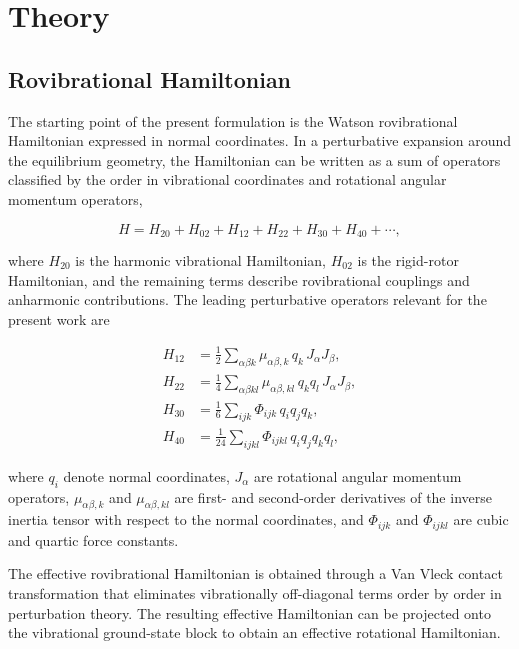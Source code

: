 \documentclass[aip,jcp,reprint]{revtex4-2}
\begin{document}
\section{Theory}

\subsection{Rovibrational Hamiltonian}

The starting point of the present formulation is the Watson rovibrational
Hamiltonian expressed in normal coordinates. In a perturbative expansion
around the equilibrium geometry, the Hamiltonian can be written as a sum
of operators classified by the order in vibrational coordinates and
rotational angular momentum operators,
\cite{Watson1968,Watson1977,AlievWatson1976}

\begin{equation}
H = H_{20} + H_{02} + H_{12} + H_{22} + H_{30} + H_{40} + \cdots ,
\end{equation}

where $H_{20}$ is the harmonic vibrational Hamiltonian,
$H_{02}$ is the rigid-rotor Hamiltonian, and the remaining terms
describe rovibrational couplings and anharmonic contributions.
The leading perturbative operators relevant for the present work are

\begin{align}
H_{12} &=
\frac{1}{2}
\sum_{\alpha\beta k}
\mu_{\alpha\beta,k}\,
q_k\,J_\alpha J_\beta ,
\\
H_{22} &=
\frac{1}{4}
\sum_{\alpha\beta kl}
\mu_{\alpha\beta,kl}\,
q_k q_l\,J_\alpha J_\beta ,
\\
H_{30} &=
\frac{1}{6}
\sum_{ijk}
\Phi_{ijk}\,
q_i q_j q_k ,
\\
H_{40} &=
\frac{1}{24}
\sum_{ijkl}
\Phi_{ijkl}\,
q_i q_j q_k q_l ,
\end{align}

where $q_i$ denote normal coordinates,
$J_\alpha$ are rotational angular momentum operators,
$\mu_{\alpha\beta,k}$ and $\mu_{\alpha\beta,kl}$ are first- and
second-order derivatives of the inverse inertia tensor with respect to
the normal coordinates, and $\Phi_{ijk}$ and $\Phi_{ijkl}$ are cubic and
quartic force constants.

The effective rovibrational Hamiltonian is obtained through a
Van Vleck contact transformation that eliminates vibrationally
off-diagonal terms order by order in perturbation theory.
The resulting effective Hamiltonian can be projected onto the
vibrational ground-state block to obtain an effective rotational
Hamiltonian.
\end{document}
